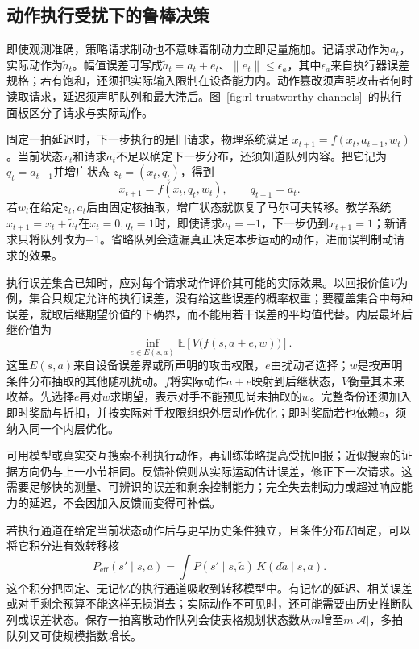 \subsection{动作执行受扰下的鲁棒决策}
\label{sec:rl-trustworthy-actuation}

即使观测准确，策略请求制动也不意味着制动力立即足量施加。记请求动作为$a_t$，实际动作为$\widetilde a_t$。幅值误差可写成$\widetilde a_t=a_t+e_t$、$\|e_t\|\leq\epsilon_a$，其中$\epsilon_a$来自执行器误差规格；若有饱和，还须把实际输入限制在设备能力内。动作篡改须声明攻击者何时读取请求，延迟须声明队列和最大滞后。图~\ref{fig:rl-trustworthy-channels}~的执行面板区分了请求与实际动作。

固定一拍延迟时，下一步执行的是旧请求，物理系统满足
$x_{t+1}=f(x_t,a_{t-1},w_t)$。当前状态$x_t$和请求$a_t$不足以确定下一步分布，还须知道队列内容。把它记为$q_t=a_{t-1}$并增广状态
$z_t=(x_t,q_t)$，得到
\begin{equation}
  x_{t+1}=f(x_t,q_t,w_t),\qquad q_{t+1}=a_t.
  \label{eq:rl-trustworthy-delay}
\end{equation}
若$w_t$在给定$z_t,a_t$后由固定核抽取，增广状态就恢复了马尔可夫转移。教学系统$x_{t+1}=x_t+\widetilde a_t$在$x_t=0,q_t=1$时，即使请求$a_t=-1$，下一步仍到$x_{t+1}=1$；新请求只将队列改为$-1$。省略队列会遗漏真正决定本步运动的动作，进而误判制动请求的效果。

执行误差集合已知时，应对每个请求动作评价其可能的实际效果。以回报价值$V$为例，集合只规定允许的执行误差，没有给这些误差的概率权重；要覆盖集合中每种误差，就取后继期望价值的下确界，而不能用若干误差的平均值代替。内层最坏后继价值为
\begin{equation}
  \inf_{e\in E(s,a)}
       \mathbb E\!\left[V\bigl(f(s,a+e,w)\bigr)\right].
  \label{eq:rl-trustworthy-actuation-backup}
\end{equation}
这里$E(s,a)$来自设备误差界或所声明的攻击权限，$e$由扰动者选择；$w$是按声明条件分布抽取的其他随机扰动。$f$将实际动作$a+e$映射到后继状态，$V$衡量其未来收益。先选择$e$再对$w$求期望，表示对手不能预见尚未抽取的$w$。完整备份还须加入即时奖励与折扣，并按实际对手权限组织外层动作优化；即时奖励若也依赖$e$，须纳入同一个内层优化。

可用模型或真实交互搜索不利执行动作，再训练策略提高受扰回报；近似搜索的证据方向仍与上一小节相同。反馈补偿则从实际运动估计误差，修正下一次请求。这需要足够快的测量、可辨识的误差和剩余控制能力；完全失去制动力或超过响应能力的延迟，不会因加入反馈而变得可补偿。

若执行通道在给定当前状态动作后与更早历史条件独立，且条件分布$K$固定，可以将它积分进有效转移核
\[
  P_{\mathrm{eff}}(s'\mid s,a)
    =\int P(s'\mid s,\widetilde a)\,K(d\widetilde a\mid s,a).
\]
这个积分把固定、无记忆的执行通道吸收到转移模型中。有记忆的延迟、相关误差或对手剩余预算不能这样无损消去；实际动作不可见时，还可能需要由历史推断队列或误差状态。保存一拍离散动作队列会使表格规划状态数从$m$增至$m|\mathcal A|$，多拍队列又可使规模指数增长。

